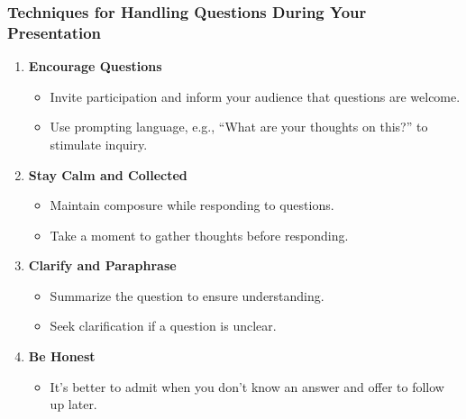\documentclass[aspectratio=169]{beamer}
\begin{document}
\begin{frame}[fragile]
  \frametitle{Techniques for Handling Questions During Your Presentation}
  \begin{enumerate}
    \item \textbf{Encourage Questions}
      \begin{itemize}
        \item Invite participation and inform your audience that questions are welcome.
        \item Use prompting language, e.g., ``What are your thoughts on this?'' to stimulate inquiry.
      \end{itemize}
      
    \item \textbf{Stay Calm and Collected}
      \begin{itemize}
        \item Maintain composure while responding to questions.
        \item Take a moment to gather thoughts before responding.
      \end{itemize}

    \item \textbf{Clarify and Paraphrase}
      \begin{itemize}
        \item Summarize the question to ensure understanding.
        \item Seek clarification if a question is unclear.
      \end{itemize}

    \item \textbf{Be Honest}
      \begin{itemize}
        \item It’s better to admit when you don’t know an answer and offer to follow up later.
      \end{itemize}
  \end{enumerate}
\end{frame}
\end{document}
